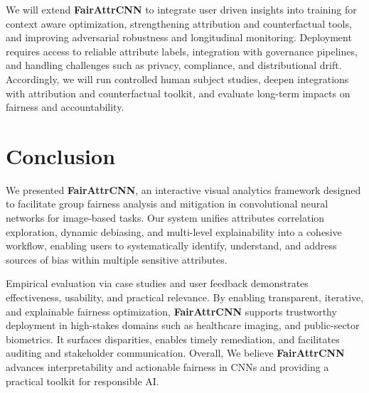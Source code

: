\documentclass[sigconf]{acmart}
\newcommand{\REVISE}[1]{#1}
\begin{document}
\REVISE{We will extend \textbf{FairAttrCNN} to integrate user driven insights into training for context aware optimization, strengthening attribution and counterfactual tools, and improving adversarial robustness and longitudinal monitoring. Deployment requires access to reliable attribute labels, integration with governance pipelines, and handling challenges such as privacy, compliance, and distributional drift. Accordingly, we will run controlled human subject studies, deepen integrations with attribution and counterfactual toolkit, and evaluate long-term impacts on fairness and accountability.}




\section{Conclusion}

We presented \textbf{FairAttrCNN}, an interactive visual analytics framework designed to facilitate group fairness analysis and mitigation in convolutional neural networks for image-based tasks. Our system unifies attributes correlation exploration, dynamic debiasing, and multi-level explainability into a cohesive workflow, enabling users to systematically identify, understand, and address sources of bias within multiple sensitive attributes.

\REVISE{Empirical evaluation via case studies and user feedback demonstrates effectiveness, usability, and practical relevance. By enabling transparent, iterative, and explainable fairness optimization, \textbf{FairAttrCNN} supports trustworthy deployment in high-stakes domains such as healthcare imaging, and public-sector biometrics. It surfaces disparities, enables timely remediation, and facilitates auditing and stakeholder communication. Overall, We believe \textbf{FairAttrCNN} advances interpretability and actionable fairness in CNNs and providing a practical toolkit for responsible AI.}



\end{document}
